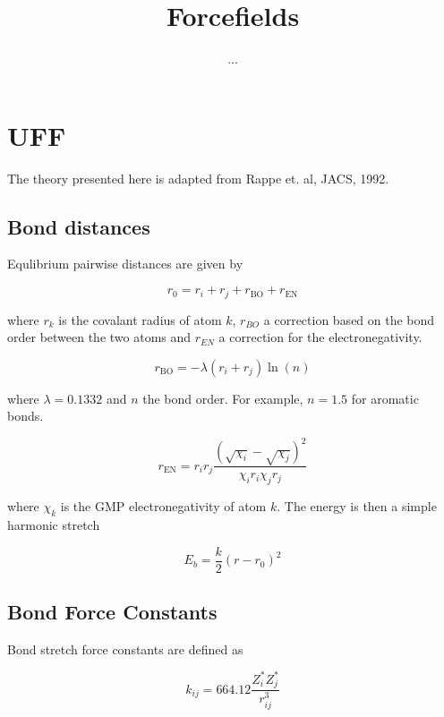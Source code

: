\documentclass[10pt]{article}
\title{Forcefields}
\author{...}
\begin{document}
\maketitle

\section{UFF}
The theory presented here is adapted from Rappe et. al, JACS, 1992.
\subsection{Bond distances}

Equlibrium pairwise distances are given by

\begin{equation}
    r_0 = r_i + r_j + r_\text{BO} + r_\text{EN}
\end{equation}

where $r_k$ is the covalant radius of atom $k$, $r_{BO}$ a correction based on the bond order between the two atoms and $r_{EN}$ a correction for the electronegativity.

\begin{equation}
    r_\text{BO} = -\lambda (r_i + r_j) \ln(n)
\end{equation}

where $\lambda = 0.1332$ and $n$ the bond order. For example, $n=1.5$ for aromatic bonds.

\begin{equation}
    r_\text{EN} = r_i r_j \frac{(\sqrt{\chi_i} - \sqrt{\chi_j})^2}{\chi_i r_i \chi_j r_j}
\end{equation}

where $\chi_k$ is the GMP electronegativity of atom $k$. The energy is then a simple
harmonic stretch

\begin{equation}
    E_{b} = \frac{k}{2}(r - r_0)^2
\end{equation}


\subsection{Bond Force Constants}

Bond stretch force constants are defined as

\begin{equation}
    k_{ij} = 664.12 \frac{Z_i^* Z_j^*}{r_{ij}^3}
\end{equation}
\end{document}
